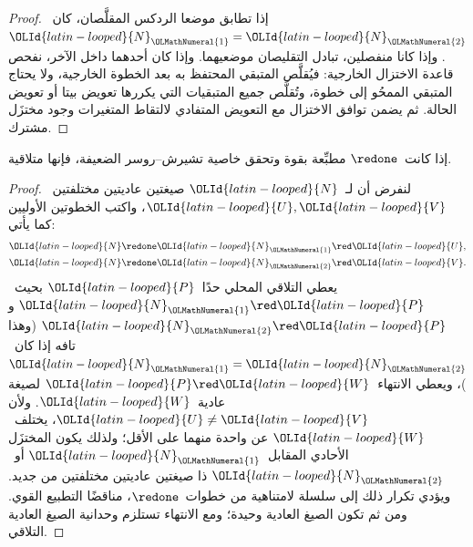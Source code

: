 \documentclass[../../../include/open-logic-section]{subfiles}
\begin{document}
\begin{proof}
  إذا تطابق موضعا الردكس المقلَّصان، كان~$\OLId{latin-looped}{N}_\OLMathNumeral{1}=\OLId{latin-looped}{N}_\OLMathNumeral{2}$. وإذا كانا منفصلين،
  تبادل التقليصان موضعيهما. وإذا كان أحدهما داخل الآخر، نفحص قاعدة الاختزال
  الخارجية: فيُقلَّص المتبقي المحتفظ به بعد الخطوة الخارجية، ولا يحتاج
  المتبقي الممحُو إلى خطوة، وتُقلَّص جميع المتبقيات التي يكررها تعويض بيتا أو
  تعويض الحالة. ثم يضمن توافق الاختزال مع التعويض المتفادي لالتقاط المتغيرات
  وجود مختزَل مشترك.
\end{proof}

\begin{lem}
إذا كانت~$\redone$ مطبِّعة بقوة وتحقق خاصية تشيرش--روسر الضعيفة، فإنها
متلاقية.
\end{lem}

\begin{proof}
  لنفرض أن لـ~$\OLId{latin-looped}{N}$ صيغتين عاديتين مختلفتين~$\OLId{latin-looped}{U},\OLId{latin-looped}{V}$، واكتب الخطوتين الأوليين
  كما يأتي:
  \begin{align*}
    \OLId{latin-looped}{N} &\redone \OLId{latin-looped}{N}_\OLMathNumeral{1}\red \OLId{latin-looped}{U},\\
    \OLId{latin-looped}{N} &\redone \OLId{latin-looped}{N}_\OLMathNumeral{2}\red \OLId{latin-looped}{V}.
  \end{align*}
  يعطي التلاقي المحلي حدًا~$\OLId{latin-looped}{P}$ بحيث~$\OLId{latin-looped}{N}_\OLMathNumeral{1}\red \OLId{latin-looped}{P}$ و$\OLId{latin-looped}{N}_\OLMathNumeral{2}\red \OLId{latin-looped}{P}$ (وهذا تافه
  إذا كان~$\OLId{latin-looped}{N}_\OLMathNumeral{1}=\OLId{latin-looped}{N}_\OLMathNumeral{2}$)، ويعطي الانتهاء~$\OLId{latin-looped}{P}\red \OLId{latin-looped}{W}$ لصيغة عادية~$\OLId{latin-looped}{W}$. ولأن
  $\OLId{latin-looped}{U}\ne \OLId{latin-looped}{V}$، يختلف~$\OLId{latin-looped}{W}$ عن واحدة منهما على الأقل؛ ولذلك يكون المختزَل الأحادي
  المقابل~$\OLId{latin-looped}{N}_\OLMathNumeral{1}$ أو~$\OLId{latin-looped}{N}_\OLMathNumeral{2}$ ذا صيغتين عاديتين مختلفتين من جديد. ويؤدي تكرار
  ذلك إلى سلسلة لامتناهية من خطوات~$\redone$، مناقضًا التطبيع القوي. ومن ثم
  تكون الصيغ العادية وحيدة؛ ومع الانتهاء تستلزم وحدانية الصيغ العادية
  التلاقي.
\end{proof}
\end{document}
